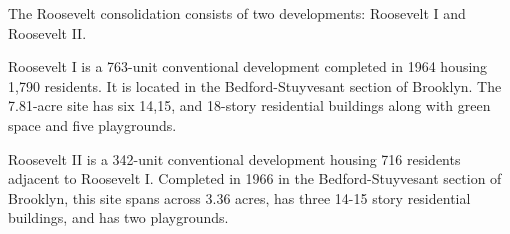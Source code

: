  

The Roosevelt consolidation consists of two developments: Roosevelt I and Roosevelt II. 

Roosevelt I is a 763-unit conventional development completed in 1964 housing 1,790 residents. It is located in the Bedford-Stuyvesant section of Brooklyn. The 7.81-acre site has six 14,15, and 18-story residential buildings along with green space and five playgrounds. 

Roosevelt II is a 342-unit conventional development housing 716 residents adjacent to Roosevelt I. Completed in 1966 in the Bedford-Stuyvesant section of Brooklyn, this site spans across 3.36 acres, has three 14-15 story residential buildings, and has two playgrounds. 